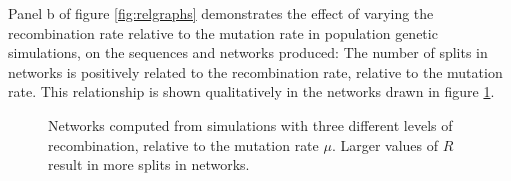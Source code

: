 Panel b of figure \ref{fig:relgraphs} demonstrates the effect of varying the recombination rate relative to the mutation rate in population genetic simulations, on the sequences and networks produced: The number of splits in networks is positively related to the recombination rate, relative to the mutation rate. This relationship is shown qualitatively in the networks drawn in figure \ref{fig:splitnets}.

\begin{figure}
\begin{center}
\caption{Networks computed from simulations with three different levels of recombination, relative to the mutation rate $\mu$.
Larger values of $R$ result in more splits in networks.\label{fig:splitnets}}
\end{center}
\end{figure}




